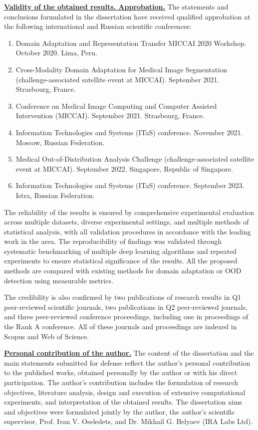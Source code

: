 \underline{\textbf{Validity of the obtained results. Approbation.}} The statements and conclusions formulated in the dissertation have received qualified approbation at the following international and Russian scientific conferences:

\begin{enumerate}
	\item Domain Adaptation and Representation Transfer MICCAI 2020 Workshop. October 2020. Lima, Peru.
    \item Cross-Modality Domain Adaptation for Medical Image Segmentation (challenge-associated satellite event at MICCAI). September 2021. Strasbourg, France.
    \item Conference on Medical Image Computing and Computer Assisted Intervention (MICCAI). September 2021. Strasbourg, France.
    \item Information Technologies and Systems (ITaS) conference. November 2021. Moscow, Russian Federation.
    \item Medical Out-of-Distribution Analysis Challenge (challenge-associated satellite event at MICCAI). September 2022. Singapore, Republic of Singapore. 
    \item Information Technologies and Systems (ITaS) conference. September 2023. Istra, Russian Federation.
\end{enumerate}

The reliability of the results is ensured by comprehensive experimental evaluation across multiple datasets, diverse experimental settings, and multiple methods of statistical analysis, with all validation procedures in accordance with the leading work in the area. The reproducibility of findings was validated through systematic benchmarking of multiple deep learning algorithms and repeated experiments to ensure statistical significance of the results. All the proposed methods are compared with existing methods for domain adaptation or OOD detection using measurable metrics.

The credibility is also confirmed by two publications of research results in Q1 peer-reviewed scientific journals, two publications in Q2 peer-reviewed journals, and three peer-reviewed conference proceedings, including one in proceedings of the Rank A conference. All of these journals and proceedings are indexed in Scopus and Web of Science.


\underline{\textbf{Personal contribution of the author.}}
The content of the dissertation and the main statements submitted for defense reflect the author’s personal contribution to the published works, obtained personally by the author or with his direct participation. The author’s contribution includes the formulation of research objectives, literature analysis, design and execution of extensive computational experiments, and interpretation of the obtained results. The dissertation aims and objectives were formulated jointly by the author, the author’s scientific supervisor, Prof. Ivan V. Oseledets, and Dr. Mikhail G. Belyaev (IRA Labs Ltd).

